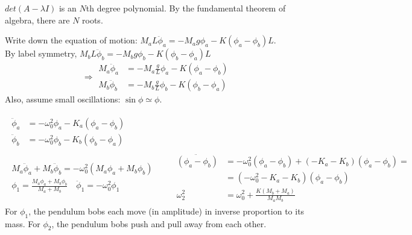 \documentclass[twoside,10pt]{amsart}
\newcommand{\problemhead}[1]
  {\smallskip
   \noindent{\large\bf Problem #1.}
   \smallskip}
\begin{document}
$det(A-\lambda I)$ is an $N$th degree polynomial.  By the fundamental theorem of algebra, there are $N$ roots.  

\problemhead{1.19} Write down the equation of motion: $M_a L \ddot{\phi}_a = -M_a g \phi_a - K (\phi_a - \phi_b)L $.  \\
By label symmetry, $M_b L \ddot{\phi}_b = -M_b g \phi_b - K (\phi_b - \phi_a)L $
\[
\Longrightarrow \begin{aligned} 
  M_a \ddot{\phi}_a & = - M_a \frac{g}{L} \phi_a - K(\phi_a - \phi_b) \\
  M_b \ddot{\phi}_b & = - M_b \frac{g}{L} \phi_b - K(\phi_b - \phi_a)
\end{aligned}
\]
Also, assume small oscillations: $\sin{\phi} \simeq \phi$.  

\[
\begin{gathered}
  \begin{aligned}
    \ddot{\phi}_a & = -\omega_0^2 \phi_a - K_a (\phi_a - \phi_b) \\ 
    \ddot{\phi}_b & = -\omega_0^2 \phi_b - K_b (\phi_b - \phi_a) 
  \end{aligned} \\
\begin{gathered}
  M_a \ddot{\phi}_a + M_b \ddot{\phi}_b = -\omega_0^2 (M_a \phi_a + M_b \phi_b) \\
  \phi_1 = \frac{M_a \phi_a + M_b \phi_b }{ M_a + M_b } \quad \ddot{\phi}_1 = -\omega_0^2 \phi_1 
\end{gathered} \quad \quad
\begin{aligned}
  \ddot{(\phi_a - \phi_b)} & = -\omega_0^2 ( \phi_a - \phi_b) + (-K_a - K_b) (\phi_a - \phi_b) = \\
  & = (-\omega_0^2 - K_a -K_b )(\phi_a - \phi_b) \\
  \omega_2^2 & = \omega_0^2 + \frac{ K (M_b + M_a ) }{ M_a M_b }
\end{aligned} 
\end{gathered}
\]
For $\phi_1$, the pendulum bobs each move (in amplitude) in inverse proportion to its mass.  
For $\phi_2$, the pendulum bobs push and pull away from each other.  
\end{document}
